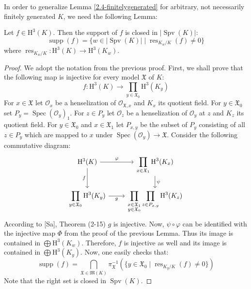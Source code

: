 In order to generalize Lemma \ref{2.4-finitelygenerated} for arbitrary, not necessarily finitely generated $K$, we need the following Lemma:

\begin{lemma}\label{2.4-closedset}
Let $f\in\mathrm{H}^3(K)$. Then the support of $f$ is closed in $|\operatorname{Spv}(K)|$:
\[ \operatorname{supp}(f) = \{w\in |\operatorname{Spv}(K)|\mid \operatorname{res}_{K_w/K}(f)\neq 0 \} \]
where $\operatorname{res}_{K_w/K}: \mathrm{H}^3(K)\to \mathrm{H}^3(K_w)$.
\end{lemma}

\begin{proof}
We adopt the notation from the previous proof. First, we shall prove that the following map is injective for every model $\mathfrak{X}$ of $K$:
\[ f: \mathrm{H}^3(K) \longrightarrow \prod_{y\in\mathfrak{X}_0}\mathrm{H}^3(K_y) \]
For $x\in\mathfrak{X}$ let $\mathcal{O}_x$ be a henselization of $\mathcal{O}_{\mathfrak{X}, x}$ and $K_x$ its quotient field. For $y\in\mathfrak{X}_0$ set $P_y=\operatorname{Spec}(\mathcal{O}_y)_1$. For $z\in P_y$ let $\mathcal{O}_z$ be a henselization of $\mathcal{O}_y$ at $z$ and $K_z$ its quotient field. For $y\in\mathfrak{X}_0$ and $x\in\mathfrak{X}_1$ let $P_{x,y}$ be the subset of $P_y$ consisting of all $z\in P_y$ which are mapped to $x$ under $\operatorname{Spec}(\mathcal{O}_y)\to\mathfrak{X}$. Consider the following commutative diagram:
\[ \begin{tikzcd}
\mathrm{H}^3(K)\ar[r, "\varphi"]\ar[d, "f"'] & \displaystyle\prod_{x\in\mathfrak{X}_1}\mathrm{H}^3(K_x)\ar[d, "\psi"]\\
\displaystyle\prod_{y\in\mathfrak{X}_0}\mathrm{H}^3(K_y) \ar[r, "g"']& \displaystyle\prod_{\substack{x\in\mathfrak{X}_1 \\ y\in\mathfrak{X}_0}}\prod_{z\in P_{x,y}}\mathrm{H}^3(K_z)
\end{tikzcd} \]
According to [Sa], Theorem (2-15) $g$ is injective. Now, $\psi\circ\varphi$ can be identified with the injective map $\Phi$ from the proof of the previous Lemma. Thus its image is contained in $\bigoplus\mathrm{H}^3(K_w)$. Therefore, $f$ is injective as well and its image is contained in $\bigoplus\mathrm{H}^3(K_y)$. Now, one easily checks that:
\[ \operatorname{supp}(f) = \bigcap_{\mathfrak{X}\in \mathfrak{M}(K)} \pi_\mathfrak{X}^{-1}(\{ y\in\mathfrak{X}_0\mid \operatorname{res}_{K_y/K}(f)\neq 0 \}) \]
Note that the right set is closed in $\operatorname{Spv}(K)$.
\end{proof}

